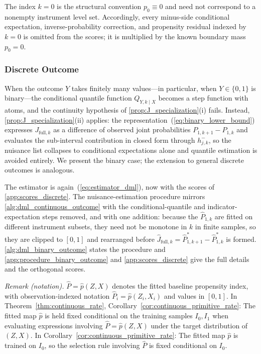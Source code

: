 The index $k=0$ is the structural convention $p_0\equiv0$ and need not correspond to a nonempty instrument level set. Accordingly, every minus-side conditional expectation, inverse-probability correction, and propensity residual indexed by $k=0$ is omitted from the scores; it is multiplied by the known boundary mass $p_0=0$.

\subsubsection{Discrete Outcome}\label{subsubsec:discrete_outcome}

When the outcome $Y$ takes finitely many values---in particular, when $Y \in \{0,1\}$ is binary---the conditional quantile function $Q_{Y,k\mid X}$ becomes a step function with atoms, and the continuity hypothesis of \cref{prop:J_specialization}(i) fails. Instead, \cref{prop:J_specialization}(ii) applies: the representation~(\ref{eq:binary_lower_bound}) expresses $J_{\text{full},k}$ as a difference of observed joint probabilities $P_{1,k+1} - P_{1,k}$ and evaluates the sub-interval contribution in closed form through $h_{j,k}^{-}$, so the nuisance list collapses to conditional expectations alone and quantile estimation is avoided entirely. We present the binary case; the extension to general discrete outcomes is analogous.

The estimator is again~(\ref{eq:estimator_dml}), now with the scores of \cref{app:scores_discrete}. The nuisance-estimation procedure mirrors \cref{alg:dml_continuous_outcome} with the conditional-quantile and indicator-expectation steps removed, and with one addition: because the $\hat P_{1,k}$ are fitted on different instrument subsets, they need not be monotone in $k$ in finite samples, so they are clipped to $[0,1]$ and rearranged before $\hat J_{\mathrm{full},k}=\hat P^*_{1,k+1}-\hat P^*_{1,k}$ is formed. \cref{alg:dml_binary_outcome} states the procedure and \cref{app:procedure_binary_outcome} and \cref{app:scores_discrete} give the full details and the orthogonal scores.

\noindent\textit{Remark (notation).} $\hat P=\hat p(Z,X)$ denotes the fitted baseline propensity index, with observation-indexed notation $\hat P_i=\hat p(Z_i,X_i)$ and values in $[0,1]$. In Theorem~\ref{thm:continuous_rate}, Corollary~\ref{cor:continuous_primitive_rate}: The fitted map $\hat p$ is held fixed conditional on the training samples $I_0,I_1$ when evaluating expressions involving $\hat P=\hat p(Z,X)$ under the target distribution of $(Z,X)$. In Corollary~\ref{cor:continuous_primitive_rate}: The fitted map $\hat p$ is trained on $I_0$, so the selection rule involving $\hat P$ is fixed conditional on $I_0$.


